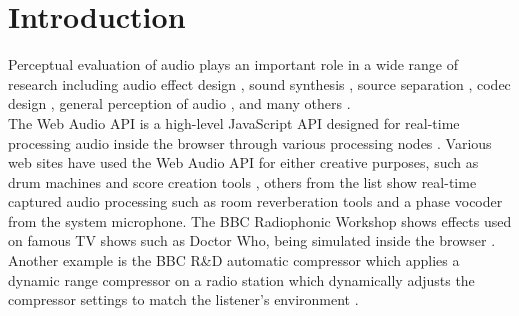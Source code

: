 \documentclass{article}
\title{\papertitle}
\begin{document}
%
\capstartfalse
\maketitle
\capstarttrue
%
\begin{abstract}
New functionality in HTML5, notably its Web Audio API, allow for increasingly powerful applications in the browser. %
Perceptual evaluation tests for audio, where the subject assesses certain qualities of different audio fragments through a graphical user interface and/or text boxes, require playback of audio and rapid switching between different files. %
The advantage of a web application is easy deployment on any platform, without requiring any other application or library, easy storing of results on a server. 
[...]

\end{abstract}


\section{Introduction}\label{sec:introduction}


Perceptual evaluation of audio plays an important role in a wide range of research including audio effect design \cite{}, sound synthesis \cite{de2013real}, source separation \cite{}, codec design \cite{}, general perception of audio \cite{schoeffler2013impact}, and many others \cite{friberg2011comparison}. \\ %

The Web Audio API is a high-level JavaScript API designed for real-time processing audio inside the browser through various processing nodes \cite{webaudioapi}. Various web sites have used the Web Audio API for either creative purposes, such as drum machines and score creation tools \cite{webaudiodemo}, %
others from the list show real-time captured audio processing such as room reverberation tools and a phase vocoder from the system microphone. The BBC Radiophonic Workshop shows effects used on famous TV shows such as Doctor Who, being simulated inside the browser \cite{bbcradiophonics}. %
Another example is the BBC R\&D automatic compressor which applies a dynamic range compressor on a radio station which dynamically adjusts the compressor settings to match the listener's environment \cite{mason2015compression}.\\ %
\end{document}
